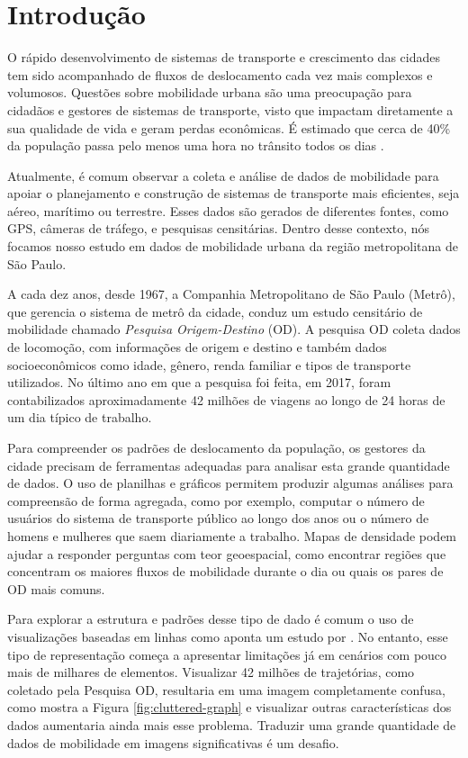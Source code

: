 \chapter{Introdução}
\label{cap:introducao}

O rápido  desenvolvimento de sistemas de transporte e crescimento das cidades
tem sido acompanhado de fluxos de deslocamento cada vez mais complexos e
volumosos. Questões sobre mobilidade urbana são uma preocupação para cidadãos e
gestores de sistemas de transporte, visto que impactam diretamente a sua
qualidade de vida e geram perdas econômicas. É estimado que cerca de 40\% da
população passa pelo menos uma hora no trânsito todos os dias \citep{Zhang2011}. 

Atualmente, é comum observar a coleta e análise de dados de mobilidade para
apoiar o planejamento e construção de sistemas de transporte mais eficientes,
seja aéreo, marítimo ou terrestre. Esses dados são gerados de diferentes
fontes, como GPS, câmeras de tráfego, e pesquisas censitárias. Dentro desse
contexto, nós focamos nosso estudo em dados de mobilidade urbana da região
metropolitana de S\~ao Paulo.

A cada dez anos, desde 1967, a Companhia Metropolitano de São Paulo (Metrô),
que gerencia o sistema de metrô da cidade, conduz um estudo censitário de
mobilidade chamado \emph{Pesquisa Origem-Destino} (OD). A pesquisa OD coleta
dados de locomoção, com informações de origem e destino e também dados
socioeconômicos como idade, gênero, renda familiar e tipos de transporte
utilizados. No último ano em que a pesquisa foi feita, em 2017, foram
contabilizados aproximadamente 42 milhões de viagens ao longo de 24 horas de um
dia típico de trabalho.

Para compreender os padrões de deslocamento da população, os gestores da cidade
precisam de ferramentas adequadas para analisar esta grande quantidade de
dados. O uso de planilhas e gráficos permitem produzir algumas análises para
compreensão de forma agregada,  como por exemplo, computar o número de usuários
do sistema de transporte público ao longo dos anos ou o número de homens e
mulheres que saem diariamente a trabalho. Mapas de densidade podem ajudar a
responder perguntas com teor geoespacial, como encontrar regiões que concentram
os maiores fluxos de mobilidade durante o dia ou quais os pares de OD mais
comuns. 

Para explorar a estrutura e padrões desse tipo de dado é comum o uso de 
visualizações baseadas em linhas como aponta um estudo por \cite{Chen2015}. No entanto,
esse tipo de representação começa a apresentar limitações já em cenários com
pouco mais de milhares de elementos. Visualizar 42 milhões de trajetórias, como
coletado pela Pesquisa OD, resultaria em uma imagem completamente confusa, como
mostra a Figura \ref{fig:cluttered-graph} e visualizar outras características
dos dados aumentaria ainda mais esse problema. Traduzir uma grande quantidade
de dados de mobilidade em imagens significativas é um desafio.


